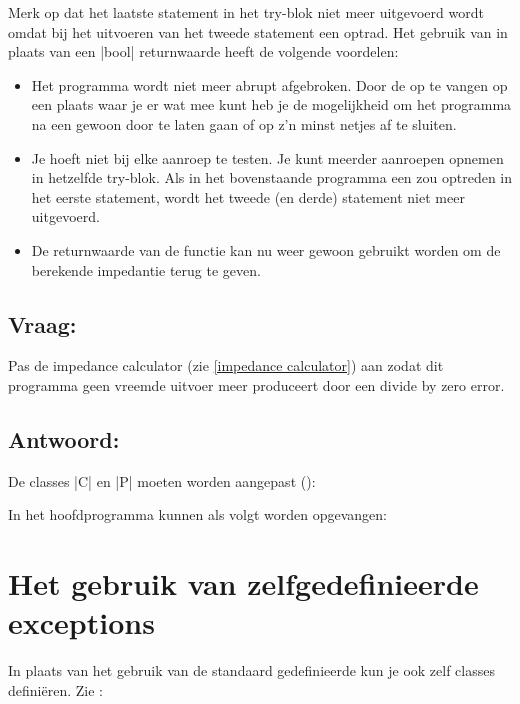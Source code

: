 \begin{cpplstShortInline}
Merk op dat het laatste statement in het try\hyp{}blok niet meer uitgevoerd wordt omdat bij het uitvoeren van het tweede statement een  optrad.
Het gebruik van  in plaats van een |bool| returnwaarde heeft de volgende voordelen:
\begin{itemize}
    \item Het programma wordt niet meer abrupt afgebroken.
    Door de  op te vangen op een plaats waar je er wat mee kunt heb je de mogelijkheid om het programma na een  gewoon door te laten gaan of op z'n minst netjes af te sluiten.
    \item Je hoeft niet bij elke aanroep te testen.
    Je kunt meerder aanroepen opnemen in hetzelfde try\hyp{}blok.
    Als in het bovenstaande programma een  zou optreden in het eerste statement, wordt het tweede (en derde) statement niet meer uitgevoerd.
    \item De returnwaarde van de functie kan nu weer gewoon gebruikt worden om de berekende impedantie terug te geven.
\end{itemize}

\subsection*{Vraag:} 
Pas de impedance calculator (zie \cref{impedance calculator}) aan zodat dit programma geen vreemde uitvoer meer produceert door een divide by zero error.

\subsection*{Antwoord:}
De classes |C| en |P| moeten worden aangepast ():
 
In het hoofdprogramma kunnen  als volgt worden opgevangen:

\section{Het gebruik van zelfgedefinieerde exceptions}
In plaats van het gebruik van de standaard gedefinieerde  kun je ook zelf  classes definiëren. Zie :



\end{cpplstShortInline}
